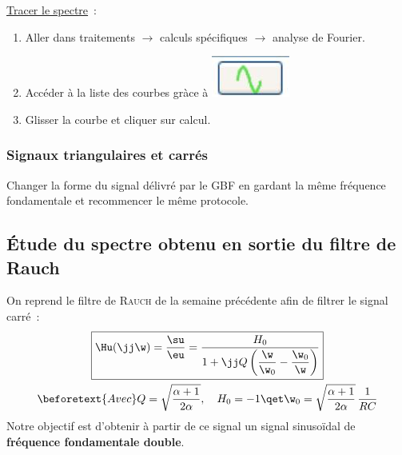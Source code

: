 \documentclass[../main/main.tex]{subfiles}
\begin{document}
\begin{tcb}[breakable]
	\underline{Tracer le spectre}~:
	\begin{enumerate}
		\item Aller dans traitements $\rightarrow$ calculs spécifiques $\rightarrow$
		      analyse de Fourier.
		\item Accéder à la liste des courbes gràce à
		      \includegraphics[height=.5cm]{bouton_courbe}
		\item Glisser la courbe et cliquer sur calcul.
	\end{enumerate} \bigbreak
\end{tcb}


\subsubsection{Signaux triangulaires et carrés}

Changer la forme du signal délivré par le GBF en gardant la même fréquence
fondamentale et recommencer le même protocole. \bigbreak


\subsection{Étude du spectre obtenu en sortie du filtre de Rauch}

On reprend le filtre de \textsc{Rauch} de la semaine précédente afin de filtrer
le signal carré~:
\begin{gather*}
	\boxed{
		\Hu(\jj \w) = \frac{\su}{\eu} = \frac{H_0}{1+\jj Q
			\left(\dfrac{\w}{\w_0}-\dfrac{\w_0}{\w}\right)}
	}
	\\
	\beforetext{Avec}
	Q = \sqrt{\frac{\alpha+1}{2\alpha}},
	\quad
	H_0 = -1
	\qet
	\w_0 = \sqrt{\frac{\alpha+1}{2\alpha}} \, \frac{1}{RC}
\end{gather*}
Notre objectif est d'obtenir à partir de ce signal un signal
sinusoïdal de \textbf{fréquence fondamentale double}.
\end{document}
